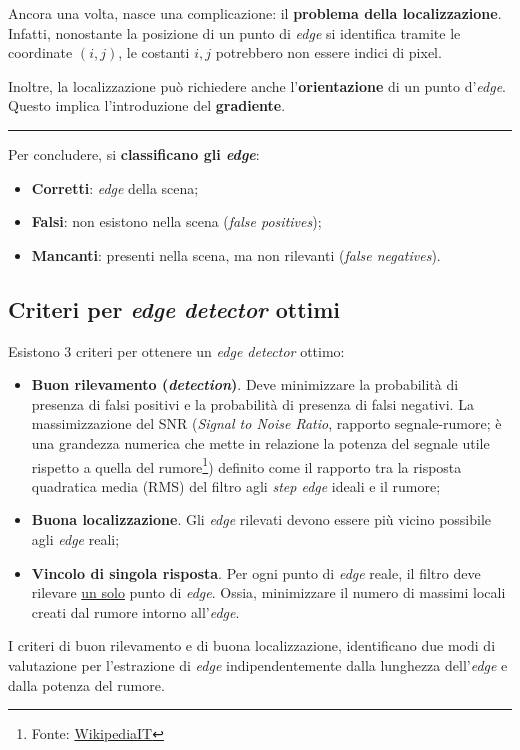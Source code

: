 \documentclass[a4paper]{article}
\newcommand{\longline}{\noindent\rule{\textwidth}{0.4pt}}
\begin{document}
	\noindent
	Ancora una volta, nasce una complicazione: il \textcolor{Red3}{\textbf{problema della localizzazione}}. Infatti, nonostante la posizione di un punto di \emph{edge} si identifica tramite le coordinate $\left(i,j\right)$, le costanti $i,j$ potrebbero non essere indici di pixel.\newline
	
	\noindent
	Inoltre, la localizzazione può richiedere anche l'\textbf{orientazione} di un punto d'\emph{edge}. Questo implica l'introduzione del \textbf{gradiente}.\newline
	
	\longline\vspace{1em}
	
	\noindent
	Per concludere, si \textbf{classificano gli \emph{edge}}:
	\begin{itemize}
		\item \textbf{Corretti}: \emph{edge} della scena;
		\item \textbf{Falsi}: non esistono nella scena (\emph{false positives});
		\item \textbf{Mancanti}: presenti nella scena, ma non rilevanti (\emph{false negatives}).
	\end{itemize}\newpage

	\subsection{Criteri per \emph{edge detector} ottimi}
	
	Esistono $3$ criteri per ottenere un \emph{edge detector} ottimo:
	\begin{itemize}
		\item \textcolor{Red3}{\textbf{Buon rilevamento (\emph{detection})}}. Deve minimizzare la probabilità di presenza di falsi positivi e la probabilità di presenza di falsi negativi.\newline
		La massimizzazione del SNR (\emph{Signal to Noise Ratio}, rapporto segnale-rumore; è una grandezza numerica che mette in relazione la potenza del segnale utile rispetto a quella del rumore\footnote{Fonte: \href{https://it.wikipedia.org/wiki/Rapporto_segnale/rumore}{WikipediaIT}}) definito come il rapporto tra la risposta quadratica media (RMS) del filtro agli \emph{step edge} ideali e il rumore;
		
		\item \textcolor{Red3}{\textbf{Buona localizzazione}}. Gli \emph{edge} rilevati devono essere più vicino possibile agli \emph{edge} reali;
		
		\item \textcolor{Red3}{\textbf{Vincolo di singola risposta}}. Per ogni punto di \emph{edge} reale, il filtro deve rilevare \underline{un solo} punto di \emph{edge}. Ossia, minimizzare il numero di massimi locali creati dal rumore intorno all'\emph{edge}.
	\end{itemize}
	I criteri di buon rilevamento e di buona localizzazione, identificano due modi di valutazione per l'estrazione di \emph{edge} indipendentemente dalla lunghezza dell'\emph{edge} e dalla potenza del rumore.\newpage
	
\end{document}
